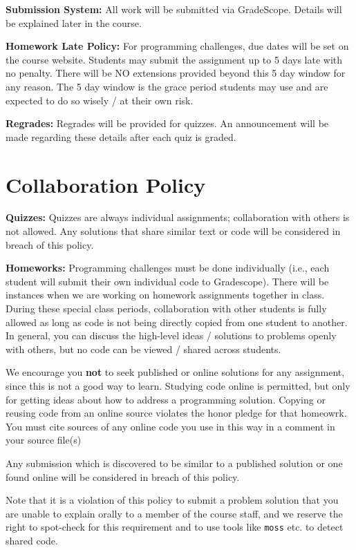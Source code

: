 \documentclass[12pt]{article}
\begin{document}
\textbf{Submission System:} All work will be submitted via GradeScope. Details will be explained later in the course. 

\textbf{Homework Late Policy:} For programming challenges, due dates will be set on the course website. Students may submit the assignment up to 5 days late with no penalty. There will be NO extensions provided beyond this 5 day window for any reason. The 5 day window is the grace period students may use and are expected to do so wisely / at their own risk.

\textbf{Regrades:} Regrades will be provided for quizzes. An announcement will be made regarding these details after each quiz is graded.

\section*{Collaboration Policy}

\textbf{Quizzes:} Quizzes are always individual assignments; collaboration with others is not allowed. Any solutions that share similar text or code will be considered in breach of this policy.

\textbf{Homeworks:} Programming challenges must be done individually (i.e., each student will submit their own individual code to Gradescope). There will be instances when we are working on homework assignments together in class. During these special class periods, collaboration with other students is fully allowed as long as code is not being directly copied from one student to another. In general, you can discuss the high-level ideas / solutions to problems openly with others, but no code can be viewed / shared across students.

We encourage you \textbf{not} to seek published or online solutions for any assignment, since this is not a good way to learn. Studying code online is permitted, but only for getting ideas about how to address a programming solution. 
Copying or reusing code from an online source violates the honor pledge for that homeowrk. 
You must cite sources of any online code you use in this way in a comment in your source file(s)

Any submission which is discovered to be similar to a published solution or one found online will be considered in breach of this policy.

Note that it is a violation of this policy to submit a problem solution that you are unable to explain orally to a member of the course staff, and we reserve the right to spot-check for this requirement and to use tools like {\tt moss} etc. to detect shared code.
\end{document}
